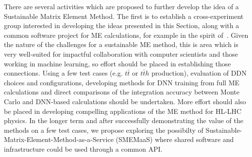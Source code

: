 There are several activities which are proposed to further develop the
idea of a Sustainable Matrix Element Method. The first is to establish
a cross-experiment group interested in developing the ideas presented
in this Section, along with a common software project for ME
calculations, for example in the spirit of~\cite{MoMEMta}. Given the
nature of the challenges for a sustainable ME method, this is area
which is very well-suited for impactful collaboration with computer
scientists and those working in machine learning, so effort should be
placed in establishing those connections. Using a few test cases
(e.g. $t\bar{t}$ or $t\bar{t}h$ production), evaluation of DDN choices
and configurations, developing methods for DNN training from full ME
calculations and direct comparisons of the integration accuracy
between Monte Carlo and DNN-based calculations should be
undertaken. More effort should also be placed in developing compelling
applications of the ME method for HL-LHC physics. In the longer term
and after successfully demonstrating the value of the methods on a few
test cases, we propose exploring the possibilty of
Sustainable-Matrix-Element-Method-as-a-Service (SMEMaaS) where shared
software and infrastructure could be used through a common API.

